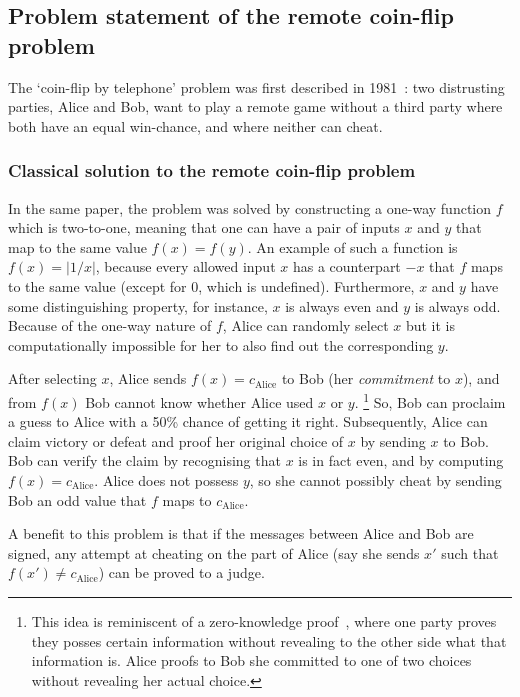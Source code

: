 \documentclass[oneside,a4paper]{article}
\begin{document}
\subsection{Problem statement of the remote coin-flip problem}
The `coin-flip by telephone' problem was first described in 1981~\cite{blum1981coin}: two distrusting parties, Alice and Bob, want to play a remote game without a third party where both have an equal win-chance, and where neither can cheat.

\subsubsection{Classical solution to the remote coin-flip problem}
In the same paper, the problem was solved by constructing a one-way function $f$ which is two-to-one, meaning that one can have a pair of inputs $x$ and $y$ that map to the same value $f(x)=f(y)$.
An example of such a function is $f(x) =|1/x|$, because every allowed input $x$ has a counterpart $-x$ that $f$ maps to the same value (except for $0$, which is undefined).
Furthermore, $x$ and $y$ have some distinguishing property, for instance, $x$ is always even and $y$ is always odd. Because of the one-way nature of $f$, Alice can randomly select $x$ but it is computationally impossible for her to also find out the corresponding $y$.

After selecting $x$, Alice sends $f(x)=c_{\text{Alice}}$ to Bob (her \textit{commitment} to $x$), and from $f(x)$ Bob cannot know whether Alice used $x$ or $y$.
\footnote{
    This idea is reminiscent of a zero-knowledge proof~\cite{goldwasser1989knowledge}, where one party proves they posses certain information without revealing to the other side what that information is.
    Alice proofs to Bob she committed to one of two choices without revealing her actual choice.
}
So, Bob can proclaim a guess to Alice with a 50\% chance of getting it right.
Subsequently, Alice can claim victory or defeat and proof her original choice of $x$ by sending $x$ to Bob.
Bob can verify the claim by recognising that $x$ is in fact even, and by computing $f(x)=c_{\text{Alice}}$.
Alice does not possess $y$, so she cannot possibly cheat by sending Bob an odd value that $f$ maps to $c_{\text{Alice}}$.

A benefit to this problem is that if the messages between Alice and Bob are signed, any attempt at cheating on the part of Alice (say she sends $x'$ such that $f(x') \neq c_{\text{Alice}}$) can be proved to a judge.
\end{document}
